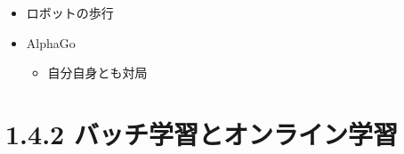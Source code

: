 \begin{itemize}
\begin{itemize}
    \begin{itemize}
    \tightlist
    \item
      ロボットの歩行
    \item
      AlphaGo

      \begin{itemize}
      \tightlist
      \item
        自分自身とも対局
      \end{itemize}
    \end{itemize}
  \end{itemize}
\end{itemize}

\hypertarget{ux30d0ux30c3ux30c1ux5b66ux7fd2ux3068ux30aaux30f3ux30e9ux30a4ux30f3ux5b66ux7fd2}{%
\section{1.4.2
バッチ学習とオンライン学習}\label{ux30d0ux30c3ux30c1ux5b66ux7fd2ux3068ux30aaux30f3ux30e9ux30a4ux30f3ux5b66ux7fd2}}

